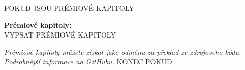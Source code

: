 \documentclass[10pt,final]{book}
\newcommand*{\nadpisobsahu}{\mbox{PŘEHLED (OBSAH)}}%

{{POKUD JE FORMÁT pdf-a4|pdf-a4-bez|pdf-výplach}}
\newenvironment*{obsahdosloupcu}{%
        \begin{multicols*}{2}\footnotesize%
    }{%
        \end{multicols*}%
    }%
\begin{document}
\pagestyle{normalni}%
%
%
%
%
\begin{obsahdosloupcu}%
    \renewcommand*{\contentsname}{\nadpisobsahu}%
    \tableofcontents%
{{POKUD JSOU PRÉMIOVÉ KAPITOLY}}
\normalsize\vspace{2ex}\par\textbf{Prémiové kapitoly:}\\[2ex]%
{\newcommand*{\premiovakapitola}[1]{$\bullet$~#1\\\relax}
{{VYPSAT PRÉMIOVÉ KAPITOLY}}
}\mbox{}\par{\itshape\small%
Prémiové kapitoly můžete získat jako odměnu za překlad ze zdrojového kódu.
Podrobnější informace na GitHubu.%
}%
{{KONEC POKUD}}
\end{obsahdosloupcu}%
%
%
\clearpage%
\mbox{}\par\vfill%
%
%
\end{document}
